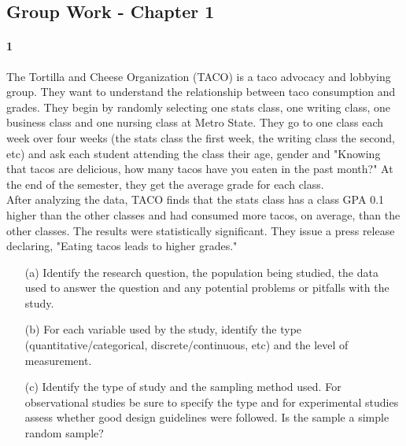\documentclass{article}
\begin{document}
\begin{flushleft}
\section*{Group Work - Chapter 1}
\paragraph{1} The Tortilla and Cheese Organization (TACO) is a taco advocacy and lobbying group. They want to understand the relationship between taco consumption and grades. They begin by randomly selecting one stats class, one writing class, one business class and one nursing class at Metro State. They go to one class each week over four weeks (the stats class the first week, the writing class the second, etc) and ask each student attending the class their age, gender and "Knowing that tacos are delicious, how many tacos have you eaten in the past month?" At the end of the semester, they get the average grade for each class.\\
\medskip
After analyzing the data, TACO finds that the stats class has a class GPA 0.1 higher than the other classes and had consumed more tacos, on average, than the other classes. The results were statistically significant. They issue a press release declaring, "Eating tacos leads to higher grades."

\begin{itemize}
\item [(a)] Identify the research question, the population being studied, the data used to answer the question and any potential problems or pitfalls with the study.
\vspace{1.5in}
\item[(b)] For each variable used by the study, identify the type (quantitative/categorical, discrete/continuous, etc) and the level of measurement.
\vspace{1.5in}
\item[(c)] Identify the type of study and the sampling method used. For observational studies be sure to specify the type and for experimental studies assess whether good design guidelines were followed. Is the sample a simple random sample? 
\end{itemize}



\newpage

\end{flushleft}
\end{document}
